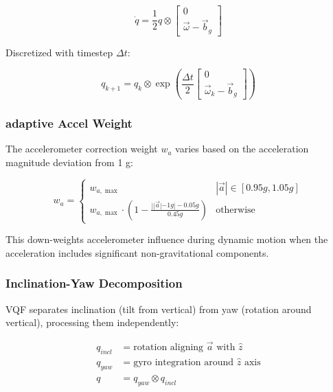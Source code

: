 \begin{equation}
    \dot{q} = \frac{1}{2} q \otimes \begin{bmatrix} 0 \\ \vec{\omega} - \vec{b}_g \end{bmatrix}
\end{equation}

Discretized with timestep $\Delta t$:

\begin{equation}
    q_{k+1} = q_k \otimes \exp\left(\frac{\Delta t}{2} \begin{bmatrix} 0 \\ \vec{\omega}_k - \vec{b}_g \end{bmatrix}\right)
\end{equation}

\subsubsection{adaptive Accel Weight}

The accelerometer correction weight $w_a$ varies based on the acceleration magnitude deviation from 1 g:

\begin{equation}
    w_a = \begin{cases}
        w_{a,\max} & |\vec{a}| \in [0.95g, 1.05g] \\
        w_{a,\max} \cdot \left(1 - \frac{||\vec{a}| - 1g| - 0.05g}{0.45g}\right) & \text{otherwise}
    \end{cases}
\end{equation}

This down-weights accelerometer influence during dynamic motion when the acceleration includes significant non-gravitational components.

\subsubsection{Inclination-Yaw Decomposition}

VQF separates inclination (tilt from vertical) from yaw (rotation around vertical), processing them independently:

\begin{align}
    q_{incl} &= \text{rotation aligning } \vec{a} \text{ with } \hat{z} \\
    q_{yaw} &= \text{gyro integration around } \hat{z} \text{ axis} \\
    q &= q_{yaw} \otimes q_{incl}
\end{align}

